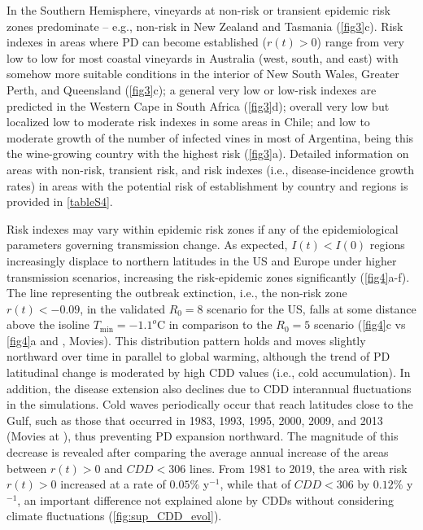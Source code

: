     In the Southern Hemisphere, vineyards at non-risk or transient
    epidemic risk zones predominate -- e.g., non-risk in New Zealand and
    Tasmania (\cref{fig3}c). Risk indexes in areas where PD can become
    established ($r(t) > 0$) range from very low to low for most coastal
    vineyards in Australia (west, south, and east) with somehow more suitable
    conditions in the interior of New South Wales, Greater Perth, and
    Queensland (\cref{fig3}c); a general very low or low-risk indexes are
    predicted in the Western Cape in South Africa (\cref{fig3}d); overall
    very low but localized low to moderate risk indexes in some areas in
    Chile; and low to moderate growth of the number of infected vines in most
    of Argentina, being this the wine-growing country with the highest risk
    (\cref{fig3}a). Detailed information on areas with non-risk, transient
    risk, and risk indexes (i.e., disease-incidence growth rates) in areas with
    the potential risk of establishment by country and regions is provided in
    \cref{tableS4}.

    Risk indexes may vary within epidemic risk zones if any of the
    epidemiological parameters governing transmission change. As expected,
$I(t) < I(0)$ regions increasingly displace to northern latitudes in the US
    and Europe under higher transmission scenarios, increasing the
    risk-epidemic zones significantly (\cref{fig4}a-f). The line representing
    the outbreak extinction, i.e., the non-risk zone $r(t)<-0.09$, in the
    validated $R_0=8$ scenario for the US, falls at some distance above the
    isoline $T_{\textrm{min}} = -1.1^o$C in comparison to the $R_0=5$ scenario
    (\cref{fig4}c vs \cref{fig4}a and \cite{Webpage}, Movies). This
    distribution pattern holds and moves slightly northward over time in
    parallel to global warming, although the trend of PD latitudinal change is
    moderated by high CDD values (i.e., cold accumulation). In addition, the
    disease extension also declines due to CDD interannual fluctuations in the
    simulations. Cold waves periodically occur that reach latitudes close to
    the Gulf, such as those that occurred in 1983, 1993, 1995, 2000, 2009, and
    2013 (Movies at \cite{Webpage}), thus preventing PD expansion northward.
    The magnitude of this decrease is revealed after comparing the average
    annual increase of the areas between $r(t) > 0$ and $CDD < 306$ lines. From
    1981 to 2019, the area with risk $r(t) > 0$ increased at a rate of $0.05\%$
    y$^{-1}$, while that of $CDD < 306$ by $0.12\%$ y$^{-1}$, an important
    difference not explained alone by CDDs without considering climate
    fluctuations (\cref{fig:sup_CDD_evol}).

